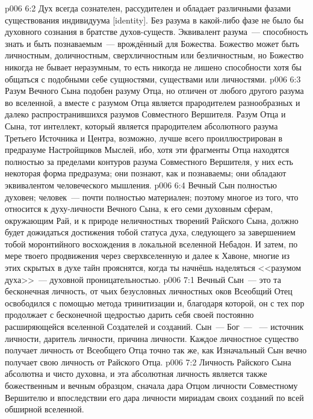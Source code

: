 \vs p006 6:2 Дух всегда сознателен, рассудителен и обладает различными фазами существования индивидуума [identity]. Без разума в какой\hyp{}либо фазе не было бы духовного сознания в братстве духов\hyp{}существ. Эквивалент разума~--- способность знать и быть познаваемым~--- врождённый для Божества. Божество может быть личностным, доличностным, сверхличностным или безличностным, но Божество никогда не бывает неразумным, то есть никогда не лишено способности хотя бы общаться с подобными себе сущностями, существами или личностями.
\vs p006 6:3 Разум Вечного Сына подобен разуму Отца, но отличен от любого другого разума во вселенной, а вместе с разумом Отца является прародителем разнообразных и далеко распространившихся разумов Совместного Вершителя. Разум Отца и Сына, тот интеллект, который является прародителем абсолютного разума Третьего Источника и Центра, возможно, лучше всего проиллюстрирован в предразуме Настройщиков Мыслей, ибо, хотя эти фрагменты Отца находятся полностью за пределами контуров разума Совместного Вершителя, у них есть некоторая форма предразума; они познают, как и познаваемы; они обладают эквивалентом человеческого мышления.
\vs p006 6:4 Вечный Сын полностью духовен; человек~--- почти полностью материален; поэтому многое из того, что относится к духу\hyp{}личности Вечного Сына, к его семи духовным сферам, окружающим Рай, и к природе неличностных творений Райского Сына, должно будет дожидаться достижения тобой статуса духа, следующего за завершением тобой моронтийного восхождения в локальной вселенной Небадон. И затем, по мере твоего продвижения через сверхвселенную и далее к Хавоне, многие из этих скрытых в духе тайн прояснятся, когда ты начнёшь наделяться <<разумом духа>>~--- духовной проницательностью.
\vs p006 7:1 Вечный Сын~--- это та бесконечная личность, от чьих безусловных личностных оков Всеобщий Отец освободился с помощью метода тринитизации и, благодаря которой, он с тех пор продолжает с бесконечной щедростью дарить себя своей постоянно расширяющейся вселенной Создателей и созданий. Сын~---  Бог~--- ~--- источник личности, даритель личности, причина личности. Каждое личностное существо получает личность от Всеобщего Отца точно так же, как Изначальный Сын вечно получает свою личность от Райского Отца.
\vs p006 7:2 Личность Райского Сына абсолютна и чисто духовна, и эта абсолютная личность является также божественным и вечным образцом, сначала дара Отцом личности Совместному Вершителю и впоследствии его дара личности мириадам своих созданий по всей обширной вселенной.

